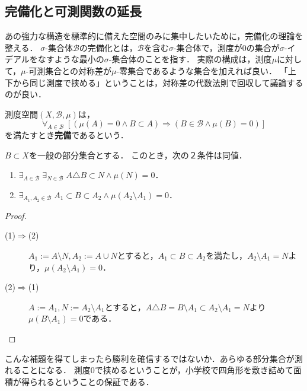 \documentclass[uplatex, dvipdfmx]{jsreport}
\renewcommand{\B}{\mathcal{B}}
\begin{document}
\subsection{完備化と可測関数の延長}

\begin{tcolorbox}[colframe=ForestGreen, colback=ForestGreen!10!white,breakable,colbacktitle=ForestGreen!40!white,coltitle=black,fonttitle=\bfseries\sffamily,
title=]
    あの強力な構造を標準的に備えた空間のみに集中したいために，完備化の理論を整える．
    $\sigma$-集合体$\B$の完備化とは，$\B$を含む$\sigma$-集合体で，測度が$0$の集合が$\sigma$-イデアルをなすような最小の$\sigma$-集合体のことを指す．
    実際の構成は，測度$\mu$に対して，$\mu$-可測集合との対称差が$\mu$-零集合であるような集合を加えれば良い．
    「上下から同じ測度で挟める」ということは，対称差の代数法則で回収して議論するのが良い．
\end{tcolorbox}

\begin{definition}[complete]
    測度空間$(X,\B,\mu)$は，
    \[\forall_{A\in\B}\;[(\mu(A)=0\land B\subset A)\Rightarrow (B\in\B\land\mu(B)=0)]\]
    を満たすとき\textbf{完備}であるという．
\end{definition}

\begin{lemma}[目標の対称差による特徴付け]\label{lemma-completeness}
    $B\subset X$を一般の部分集合とする．
    このとき，次の２条件は同値．
    \begin{enumerate}
        \item $\exists_{A\in\B}\;\exists_{N\in\B}\;A\triangle B\subset N\land\mu(N)=0$．
        \item $\exists_{A_1,A_2\in\B}\;A_1\subset B\subset A_2\land\mu(A_2\setminus A_1)=0$．
    \end{enumerate}
\end{lemma}
\begin{proof}\mbox{}
    \begin{description}
        \item[(1)$\Rightarrow$(2)] $A_1:=A\setminus N,A_2:=A\cup N$とすると，$A_1\subset B\subset A_2$を満たし，$A_2\setminus A_1=N$より，$\mu(A_2\setminus A_1)=0$．
        \item[(2)$\Rightarrow$(1)] $A:=A_1,N:=A_2\setminus A_1$とすると，$A\triangle B=B\setminus A_1\subset A_2\setminus A_1=N$より$\mu(B\setminus A_1)=0$である．
    \end{description}
\end{proof}
\begin{remarks}[これが完備性か！]
    こんな補題を得てしまったら勝利を確信するではないか．あらゆる部分集合が測れることになる．
    測度$0$で挟めるということが，小学校で四角形を敷き詰めて面積が得られるということの保証である．
\end{remarks}
\end{document}
